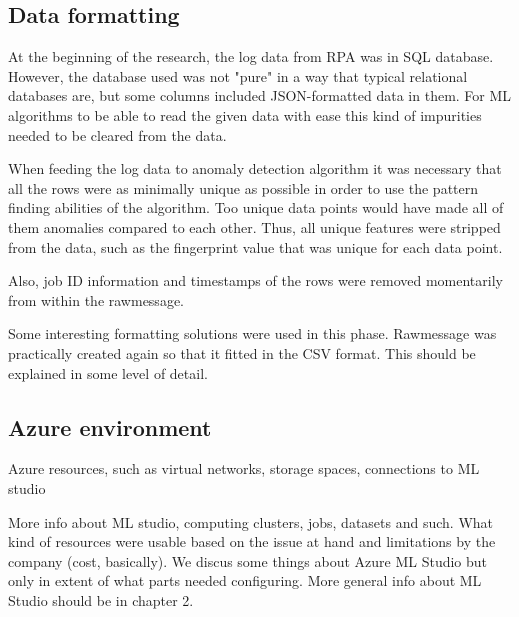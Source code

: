 \subsection{Data formatting}\label{subsubsec:data-formatting}
At the beginning of the research,
the log data from RPA was in SQL database.
However,
the database used was not "pure"
in a way that typical relational databases are,
but some columns included JSON-formatted data in them.
For ML algorithms to be able to read the given data with ease
this kind of impurities needed to be cleared from the data.

When feeding the log data to anomaly detection algorithm
it was necessary that all the rows were
as minimally unique as possible
in order to use the pattern finding abilities of the algorithm.
Too unique data points would have made all of them anomalies
compared to each other.
Thus, all unique features were stripped from the data,
such as the fingerprint value
that was unique for each data point.
\begin{itcomment}
    Also,
    job ID information and timestamps of the rows
    were removed momentarily from within the rawmessage.
\end{itcomment}

\begin{itcomment}
    Some interesting formatting solutions were used in this phase.
    Rawmessage was practically created again
    so that it fitted in the CSV format.
    This should be explained in some level of detail.
\end{itcomment}




\subsection{Azure environment}\label{subsec:meth-azure-environment}

\begin{itcomment}
    Azure resources, such as virtual networks, storage spaces, connections to ML studio \etc

    More info about ML studio,
    computing clusters, jobs, datasets and such.
    What kind of resources were usable based on the issue at hand
    and limitations by the company (cost, basically).
    We discus some things about Azure ML Studio
    but only in extent of what parts needed configuring.
    More general info about ML Studio should be in chapter 2.
\end{itcomment}

